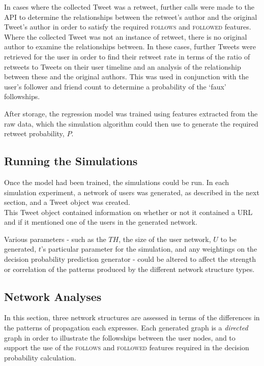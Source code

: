 In cases where the collected Tweet was a retweet, further calls were made to the API to determine the relationships between the retweet's author and the original Tweet's author in order to satisfy the required \textsc{follows} and \textsc{followed} features.
Where the collected Tweet was not an instance of retweet, there is no original author to examine the relationships between. In these cases, further Tweets were retrieved for the user in order to find their retweet rate in terms of the ratio of retweets to Tweets on their user timeline and an analysis of the relationship between these and the original authors. This was used in conjunction with the user's follower and friend count to determine a probability of the `faux' followships.

After storage, the regression model was trained using features extracted from the raw data, which the simulation algorithm could then use to generate the required retweet probability, $P$.


\subsection{Running the Simulations}
Once the model had been trained, the simulations could be run. In each simulation experiment, a network of users was generated, as described in the next section, and a Tweet object was created.\\
This Tweet object contained information on whether or not it contained a URL and if it mentioned one of the users in the generated network. 

Various parameters - such as the $TH$, the size of the user network, $U$ to be generated, $t$'s particular parameter for the simulation, and any weightings on the decision probability prediction generator - could be altered to affect the strength or correlation of the patterns produced by the different network structure types.


\subsection{Network Analyses}
In this section, three network structures are assessed in terms of the differences in the patterns of propagation each expresses. Each generated graph is a \textit{directed} graph in order to illustrate the followships between the user nodes, and to support the use of the \textsc{follows} and \textsc{followed} features required in the decision probability calculation.

